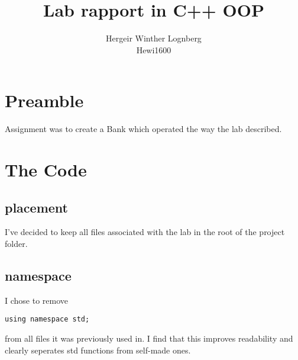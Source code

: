 \documentclass[11pt]{article}
\title{\textbf{Lab rapport in C++ OOP}}
\author{Hergeir Winther Lognberg \\
Hewi1600}
\date{}
\begin{document}
\maketitle

\section{Preamble}

Assignment was to create a Bank which operated the way the lab described.

\section{The Code}
\subsection{placement}
I've decided to keep all files associated with the lab in the root of the project folder.

\subsection{namespace}
I chose to remove
\begin{lstlisting}
using namespace std;
\end{lstlisting}
from all files it was previously used in. I find that this improves readability and clearly seperates std functions from self-made ones.
\end{document}
